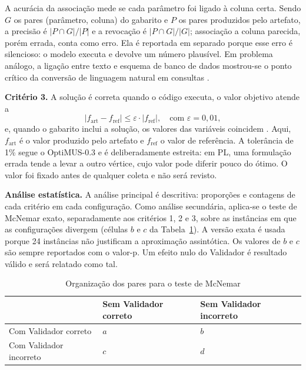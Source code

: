 A acurácia da associação mede se cada parâmetro foi ligado à coluna certa. Sendo $G$ os pares (parâmetro, coluna) do gabarito e $P$ os pares produzidos pelo artefato, a precisão é $|P \cap G|/|P|$ e a revocação é $|P \cap G|/|G|$; associação a coluna parecida, porém errada, conta como erro. Ela é reportada em separado porque esse erro é silencioso: o modelo executa e devolve um número plausível. Em problema análogo, a ligação entre texto e esquema de banco de dados mostrou-se o ponto crítico da conversão de linguagem natural em consultas \cite{lei2020}.

\textbf{Critério 3.} A solução é correta quando o código executa, o valor objetivo atende a
\begin{equation*}
  |f_{\mathrm{art}} - f_{\mathrm{ref}}| \leq \varepsilon \cdot |f_{\mathrm{ref}}|, \quad \text{com } \varepsilon = 0{,}01,
\end{equation*}
e, quando o gabarito inclui a solução, os valores das variáveis coincidem \cite{ahmaditeshnizi2026}. Aqui, $f_{\mathrm{art}}$ é o valor produzido pelo artefato e $f_{\mathrm{ref}}$ o valor de referência. A tolerância de 1\% segue o OptiMUS-0.3 e é deliberadamente estreita: em PL, uma formulação errada tende a levar a outro vértice, cujo valor pode diferir pouco do ótimo. O valor foi fixado antes de qualquer coleta e não será revisto.

\textbf{Análise estatística.} A análise principal é descritiva: proporções e contagens de cada critério em cada configuração. Como análise secundária, aplica-se o teste de McNemar exato, separadamente aos critérios 1, 2 e 3, sobre as instâncias em que as configurações divergem (células $b$ e $c$ da Tabela~\ref{t:mcnemar}). A versão exata é usada porque 24 instâncias não justificam a aproximação assintótica. Os valores de $b$ e $c$ são sempre reportados com o valor-p. Um efeito nulo do Validador é resultado válido e será relatado como tal.

\begin{table}[htbp]
\caption{Organização dos pares para o teste de McNemar}
\label{t:mcnemar}
\centering
\begin{tabular}{@{}l l l@{}}
\toprule
 & Sem Validador correto & Sem Validador incorreto \\
\midrule
Com Validador correto   & $a$ & $b$ \\
Com Validador incorreto & $c$ & $d$ \\
\bottomrule
\end{tabular}
\end{table}

